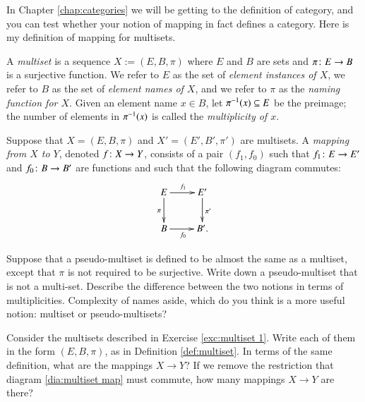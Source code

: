 In Chapter \ref{chap:categories} we will be getting to the definition of category, and you can test whether your notion of mapping in fact defines a category. Here is my definition of mapping for multisets.

\begin{definition}\label{def:multiset}

A {\em multiset} is a sequence $X:=(E,B,\pi)$ where $E$ and $B$ are sets and $\pi\colon E\rightarrow B$ is a surjective function. We refer to $E$ as the set of {\em element instances of $X$}, we refer to $B$ as the set of {\em element names of $X$}, and we refer to $\pi$ as the {\em naming function for $X$}. Given an element name $x\in B$, let $\pi^\m1(x)\ss E$ be the preimage; the number of elements in $\pi^\m1(x)$ is called the {\em multiplicity of $x$}.

Suppose that $X=(E,B,\pi)$ and $X'=(E',B',\pi')$ are multisets. A {\em mapping from $X$ to $Y$}, denoted $f\colon X\rightarrow Y$, consists of a pair $(f_1,f_0)$ such that $f_1\colon E\rightarrow E'$ and $f_0\colon B\rightarrow B'$ are functions and such that the following diagram commutes:
\begin{align}\label{dia:multiset map}
\xymatrix{E\ar[r]^{f_1}\ar[d]_{\pi}&E'\ar[d]^{\pi'}\\B\ar[r]_{f_0}&B'.}
\end{align}

\end{definition}

\begin{exercise}
Suppose that a pseudo-multiset is defined to be almost the same as a multiset, except that $\pi$ is not required to be surjective. 
\sexc Write down a pseudo-multiset that is not a multi-set. 
\next Describe the difference between the two notions in terms of multiplicities. 
\next Complexity of names aside, which do you think is a more useful notion: multiset or pseudo-multisets? 
\endsexc
\end{exercise}

\begin{exercise}
Consider the multisets described in Exercise \ref{exc:multiset 1}. 
\sexc Write each of them in the form $(E,B,\pi)$, as in Definition \ref{def:multiset}. 
\next In terms of the same definition, what are the mappings $X\to Y$? 
\next If we remove the restriction that diagram \ref{dia:multiset map} must commute, how many mappings $X\to Y$ are there?
\endsexc
\end{exercise}

